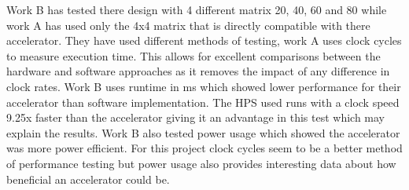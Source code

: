 Work B has tested there design with 4 different matrix 20, 40, 60 and 80 while work A has used only the 4x4 matrix that is directly compatible with there accelerator. They have used different methods of testing, work A uses clock cycles to measure execution time. This allows for excellent comparisons between the hardware and software approaches as it removes the impact of any difference in clock rates. Work B uses runtime in ms which showed lower performance for their accelerator than software implementation. The HPS used runs with a clock speed 9.25x faster than the accelerator giving it an advantage in this test which may explain the results. Work B also tested power usage which showed the accelerator was more power efficient. For this project clock cycles seem to be a better method of performance testing but power usage also provides interesting data about how beneficial an accelerator could be.